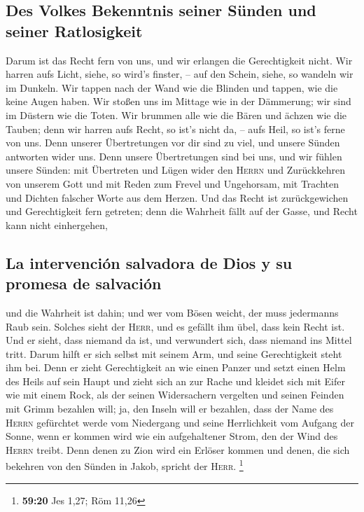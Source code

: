 \hypertarget{des-volkes-bekenntnis-seiner-suxfcnden-und-seiner-ratlosigkeit}{%
\subsection{Des Volkes Bekenntnis seiner Sünden und seiner
Ratlosigkeit}\label{des-volkes-bekenntnis-seiner-suxfcnden-und-seiner-ratlosigkeit}}

 Darum ist das Recht fern von uns, und wir erlangen die
Gerechtigkeit nicht. Wir harren aufs Licht, siehe, so wird's finster, --
auf den Schein, siehe, so wandeln wir im Dunkeln.  Wir
tappen nach der Wand wie die Blinden und tappen, wie die keine Augen
haben. Wir stoßen uns im Mittage wie in der Dämmerung; wir sind im
Düstern wie die Toten.  Wir brummen alle wie die Bären
und ächzen wie die Tauben; denn wir harren aufs Recht, so ist's nicht
da, -- aufs Heil, so ist's ferne von uns.  Denn unserer
Übertretungen vor dir sind zu viel, und unsere Sünden antworten wider
uns. Denn unsere Übertretungen sind bei uns, und wir fühlen unsere
Sünden:  mit Übertreten und Lügen wider den
\textsc{Herrn} und Zurückkehren von unserem Gott und mit Reden zum
Frevel und Ungehorsam, mit Trachten und Dichten falscher Worte aus dem
Herzen.  Und das Recht ist zurückgewichen und
Gerechtigkeit fern getreten; denn die Wahrheit fällt auf der Gasse, und
Recht kann nicht einhergehen,

\hypertarget{la-intervenciuxf3n-salvadora-de-dios-y-su-promesa-de-salvaciuxf3n}{%
\subsection{La intervención salvadora de Dios y su promesa de
salvación}\label{la-intervenciuxf3n-salvadora-de-dios-y-su-promesa-de-salvaciuxf3n}}

 und die Wahrheit ist dahin; und wer vom Bösen weicht,
der muss jedermanns Raub sein. Solches sieht der \textsc{Herr}, und es
gefällt ihm übel, dass kein Recht ist.  Und er sieht,
dass niemand da ist, und verwundert sich, dass niemand ins Mittel tritt.
Darum hilft er sich selbst mit seinem Arm, und seine Gerechtigkeit steht
ihm bei.  Denn er zieht Gerechtigkeit an wie einen Panzer
und setzt einen Helm des Heils auf sein Haupt und zieht sich an zur
Rache und kleidet sich mit Eifer wie mit einem Rock,  als
der seinen Widersachern vergelten und seinen Feinden mit Grimm bezahlen
will; ja, den Inseln will er bezahlen,  dass der Name des
\textsc{Herrn} gefürchtet werde vom Niedergang und seine Herrlichkeit
vom Aufgang der Sonne, wenn er kommen wird wie ein aufgehaltener Strom,
den der Wind des \textsc{Herrn} treibt.  Denn denen zu
Zion wird ein Erlöser kommen und denen, die sich bekehren von den Sünden
in Jakob, spricht der \textsc{Herr}. \footnote{\textbf{59:20} Jes 1,27;
  Röm 11,26}

